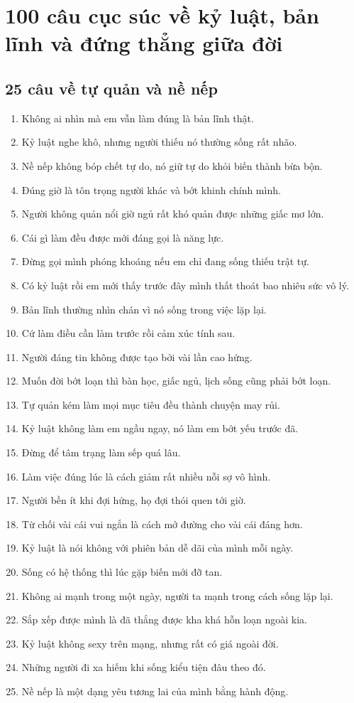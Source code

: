 \chapter{100 câu cục súc về kỷ luật, bản lĩnh và đứng thẳng giữa đời}

\section{25 câu về tự quản và nề nếp}
\begin{enumerate}[leftmargin=*]
\item Không ai nhìn mà em vẫn làm đúng là bản lĩnh thật.
\item Kỷ luật nghe khô, nhưng người thiếu nó thường sống rất nhão.
\item Nề nếp không bóp chết tự do, nó giữ tự do khỏi biến thành bừa bộn.
\item Đúng giờ là tôn trọng người khác và bớt khinh chính mình.
\item Người không quản nổi giờ ngủ rất khó quản được những giấc mơ lớn.
\item Cái gì làm đều được mới đáng gọi là năng lực.
\item Đừng gọi mình phóng khoáng nếu em chỉ đang sống thiếu trật tự.
\item Có kỷ luật rồi em mới thấy trước đây mình thất thoát bao nhiêu sức vô lý.
\item Bản lĩnh thường nhìn chán vì nó sống trong việc lặp lại.
\item Cứ làm điều cần làm trước rồi cảm xúc tính sau.
\item Người đáng tin không được tạo bởi vài lần cao hứng.
\item Muốn đời bớt loạn thì bàn học, giấc ngủ, lịch sống cũng phải bớt loạn.
\item Tự quản kém làm mọi mục tiêu đều thành chuyện may rủi.
\item Kỷ luật không làm em ngầu ngay, nó làm em bớt yếu trước đã.
\item Đừng để tâm trạng làm sếp quá lâu.
\item Làm việc đúng lúc là cách giảm rất nhiều nỗi sợ vô hình.
\item Người bền ít khi đợi hứng, họ đợi thói quen tới giờ.
\item Từ chối vài cái vui ngắn là cách mở đường cho vài cái đáng hơn.
\item Kỷ luật là nói không với phiên bản dễ dãi của mình mỗi ngày.
\item Sống có hệ thống thì lúc gặp biến mới đỡ tan.
\item Không ai mạnh trong một ngày, người ta mạnh trong cách sống lặp lại.
\item Sắp xếp được mình là đã thắng được kha khá hỗn loạn ngoài kia.
\item Kỷ luật không sexy trên mạng, nhưng rất có giá ngoài đời.
\item Những người đi xa hiếm khi sống kiểu tiện đâu theo đó.
\item Nề nếp là một dạng yêu tương lai của mình bằng hành động.
\end{enumerate}

